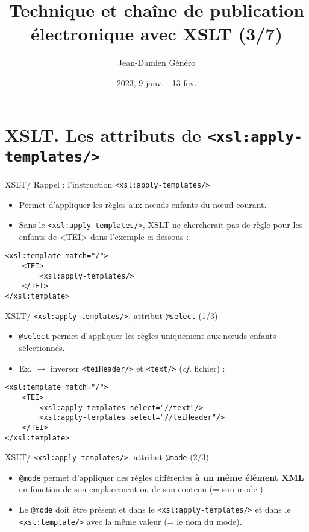 \documentclass{beamer}
\title{Technique et chaîne de publication électronique avec XSLT (3/7)}
\date{2023, 9 janv. - 13 fev.}
\author{Jean-Damien Généro}
\institute{École nationale des chartes -- M2 TNAH}
\begin{document}
    \maketitle

    \section{XSLT. Les attributs de \texttt{<xsl:apply-templates/>}}

    \begin{frame}[fragile]{XSLT/ Rappel : l'instruction \texttt{<xsl:apply-templates/>}}
        \Large
        \begin{itemize}
            \item Permet d'appliquer les règles aux n\oe uds enfants du n\oe ud courant.
            \item Sans le \texttt{<xsl:apply-templates/>}, XSLT ne chercherait pas de règle pour les enfants de <TEI> dans l'exemple ci-dessous :
        \end{itemize}
        \begin{verbatim}
<xsl:template match="/">
    <TEI>
        <xsl:apply-templates/>
    </TEI>
</xsl:template>
        \end{verbatim}
    \end{frame}

    \begin{frame}[fragile]{XSLT/ \texttt{<xsl:apply-templates/>}, attribut \texttt{@select} (1/3)}
        \Large
        \begin{itemize}
            \item \texttt{@select} permet d'appliquer les règles uniquement aux n\oe uds enfants sélectionnés.
            \bigskip
            \item Ex. $\rightarrow$ inverser \texttt{<teiHeader/>} et \texttt{<text/>} (\textit{cf.} fichier) : 
        \end{itemize}
        \normalsize
        \begin{verbatim}
<xsl:template match="/">
    <TEI>
        <xsl:apply-templates select="//text"/>
        <xsl:apply-templates select="//teiHeader"/>
    </TEI>
</xsl:template>
        \end{verbatim}
    \end{frame}

    \begin{frame}{XSLT/ \texttt{<xsl:apply-templates/>}, attribut \texttt{@mode} (2/3)}
        \Large
        \begin{itemize}
            \item \texttt{@mode} permet d'appliquer des règles différentes \textbf{à un même élément XML} en fonction de son emplacement ou de son contenu (= son \og mode \fg).
            \bigskip
            \item Le \texttt{@mode} doit être présent et dans le \texttt{<xsl:apply-templates/>} et dans le \texttt{<xsl:template/>} avec la même valeur (= le nom du mode).
        \end{itemize}
    \end{frame}
\end{document}

